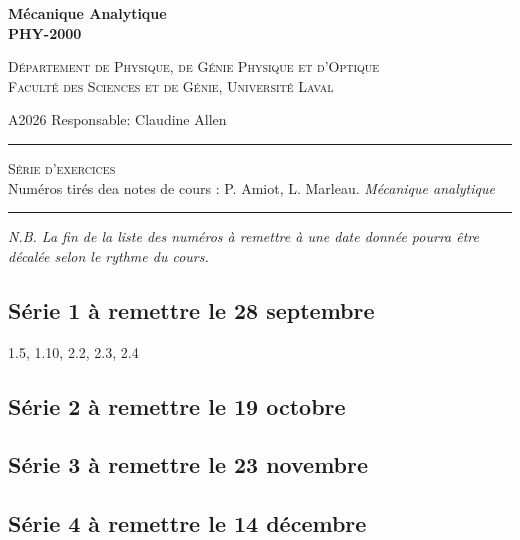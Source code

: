 \documentclass[english,french,12pt]{article} %
\begin{document}
%
%
\begin{center}
    \textbf{\large{Mécanique Analytique}}\\
    \vspace{0.2em}
    \textbf{PHY-2000}\par
    \textsc{Département de Physique, de Génie Physique et d'Optique\\
    Faculté des Sciences et de Génie, Université Laval}
\end{center}

\vspace{-1em}
\noindent A2026 \hfill Responsable: Claudine Allen\par
\vspace{0.2em}
\hrule
\vspace{0.5em}
\centering 
    \textsc{Série d'exercices}\\
\vspace{0.8em}
Numéros tirés dea notes de cours : P. Amiot, L. Marleau. \textit{Mécanique analytique} 
\vspace{0.4em}
\hrule
\justify
%
\vspace{-0.5em}
\textit{\footnotesize N.B. La fin de la liste des numéros à remettre à une date donnée pourra être décalée selon le rythme du cours.}

\subsection*{Série 1 à remettre le 28 septembre}
1.5, 1.10, 2.2, 2.3, 2.4

\subsection*{Série 2 à remettre le 19 octobre}

\subsection*{Série 3 à remettre le 23 novembre}

\subsection*{Série 4 à remettre le 14 décembre}
\end{document}

